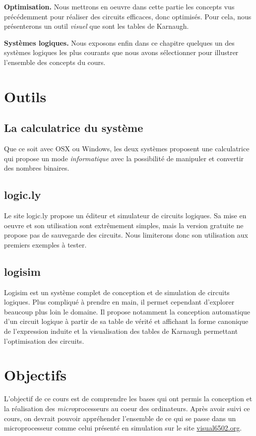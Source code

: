 \documentclass[a4paper,11pt]{book}
\begin{document}
\textbf{Optimisation.} Nous mettrons en oeuvre dans cette partie les concepts vus précédemment pour réaliser des circuits efficaces, donc optimisés. Pour cela, nous présenterons un outil \textit{visuel} que sont les tables de Karnaugh.

\textbf{Systèmes logiques.} Nous exposons enfin dans ce chapitre quelques un des systèmes logiques les plus courants que nous avons sélectionner pour illustrer l'ensemble des concepts du cours.

\section{Outils}
\subsection{La calculatrice du système}
Que ce soit avec OSX ou Windows, les deux systèmes proposent une calculatrice qui propose un mode \textit{informatique} avec la possibilité de manipuler et convertir des nombres binaires.
\subsection{logic.ly}
Le site logic.ly propose un éditeur et simulateur de circuits logiques. Sa mise en oeuvre et son utilisation sont extrêmement simples, mais la version gratuite ne propose pas de sauvegarde des circuits. Nous limiterons donc son utilisation aux premiers exemples à tester.
\subsection{logisim}
Logisim est un système complet de conception et de simulation de circuits logiques. Plus compliqué à prendre en main, il permet cependant d'explorer beaucoup plus loin le domaine. Il propose notamment la conception automatique d'un circuit logique à partir de sa table de vérité et affichant la forme canonique de l'expression induite et la visualisation des tables de Karnaugh permettant l'optimisation des circuits.

\section{Objectifs}
L'objectif de ce cours est de comprendre les bases qui ont permis la conception et la réalisation des \textit{micro}processeurs au coeur des ordinateurs. Après avoir suivi ce cours, on devrait pouvoir appréhender l'ensemble de ce qui se passe dans un microprocesseur comme celui présenté en simulation sur le site \url{visual6502.org}.

%    
\end{document}
